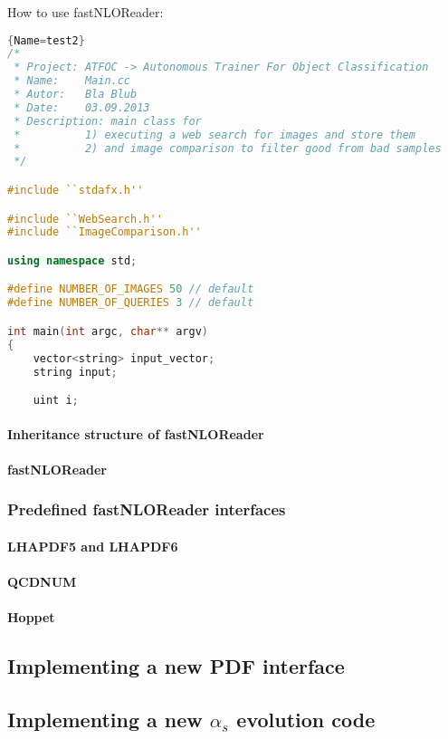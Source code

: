 \documentclass[a4paper,11pt]{article}
\begin{document}
How to use fastNLOReader:
%

\begin{lstlisting}[language=C++]{Name=test2}
/*
 * Project: ATFOC -> Autonomous Trainer For Object Classification
 * Name:    Main.cc 
 * Autor:   Bla Blub
 * Date:    03.09.2013
 * Description: main class for 
 *          1) executing a web search for images and store them
 *          2) and image comparison to filter good from bad samples
 */

#include ``stdafx.h''

#include ``WebSearch.h''
#include ``ImageComparison.h''

using namespace std;

#define NUMBER_OF_IMAGES 50 // default
#define NUMBER_OF_QUERIES 3 // default

int main(int argc, char** argv)
{
    vector<string> input_vector;
    string input;

    uint i;

 \end{lstlisting}


\paragraph{Inheritance structure of fastNLOReader}
\paragraph{fastNLOReader}
\subsubsection{Predefined fastNLOReader interfaces}
\paragraph{LHAPDF5 and LHAPDF6}
\paragraph{QCDNUM}
\paragraph{Hoppet}
\subsection{Implementing a new PDF interface}
\subsection{Implementing a new $\alpha_s$ evolution code}
\end{document}
